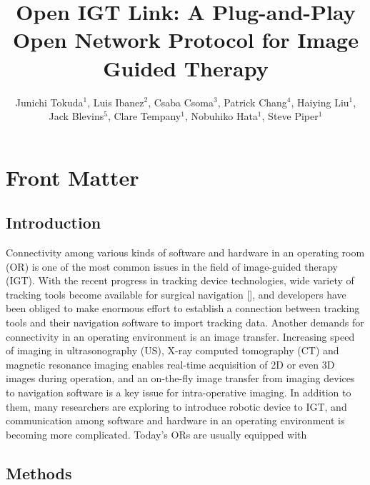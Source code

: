 \documentclass{InsightArticle}
\title{Open IGT Link: A Plug-and-Play Open Network Protocol for Image Guided Therapy}
\author{Junichi Tokuda$^{1}$, Luis Ibanez$^{2}$, Csaba Csoma$^{3}$, Patrick Chang$^{4}$, Haiying Liu$^{1}$, Jack Blevins$^{5}$, Clare Tempany$^{1}$, Nobuhiko Hata$^{1}$, Steve Piper$^{1}$}
\begin{document}
\ifpdf
\else
\fi


\maketitle


\ifhtml
\chapter*{Front Matter\label{front}}
\fi


\begin{abstract}
\noindent
\end{abstract}

\tableofcontents

\section{Introduction}
Connectivity among various kinds of software and hardware in an operating room (OR)
is one of the most common issues in the field of image-guided therapy (IGT).
With the recent progress in tracking device technologies, wide variety of
tracking tools become available for surgical navigation [], and developers
have been obliged to make enormous effort to establish a connection between
tracking tools and their navigation software to import tracking data.
Another demands for connectivity in an operating environment is an image transfer.
Increasing speed of imaging in ultrasonography (US), X-ray computed tomography
(CT) and magnetic resonance imaging enables real-time acquisition of 2D or even
3D images during operation, and an on-the-fly image transfer from imaging devices
to navigation software is a key issue for intra-operative imaging.
In addition to them, many researchers are exploring to introduce robotic device to IGT,
and communication among software and hardware in an operating environment
is becoming more complicated. Today's ORs are usually equipped with  


\section{Methods}
\end{document}
